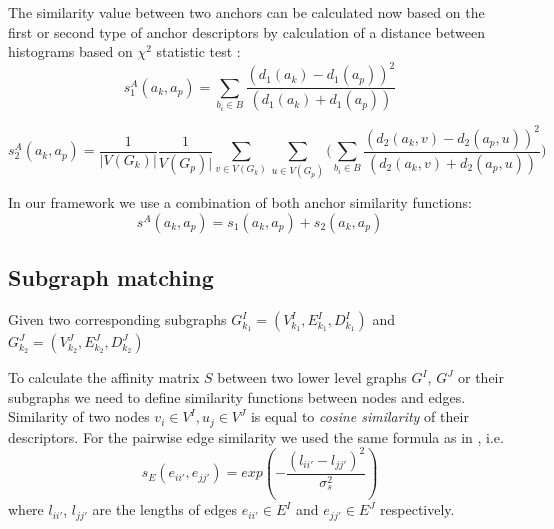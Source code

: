 The similarity value between two anchors can be calculated now based on the first or second type of anchor descriptors by calculation of a distance between histograms based on $\chi^2$ statistic test \cite{Weken2004_ChiSqTest}:
\begin{equation}
s^A_1(a_k, a_p) = \sum_{b_i\in B}\frac{(d_1(a_k)-d_1(a_p))^2}{(d_1(a_k)+d_1(a_p))}
\end{equation}

\begin{equation}
s^A_2(a_k, a_p) = \frac{1}{|V(G_k)|}\frac{1}{V(G_p)|}\sum_{v\in V(G_k)}\sum_{u\in V(G_p)} \big(\sum_{b_i\in B}\frac{(d_2(a_k,v)-d_2(a_p,u))^2}{(d_2(a_k,v)+d_2(a_p,u))}\big)
\end{equation}

In our framework we use a combination of both anchor similarity functions:
\begin{equation}
s^A(a_k, a_p) = s_1(a_k, a_p)+s_2(a_k, a_p) 
\end{equation}

\subsection{Subgraph matching}
Given two corresponding subgraphs $G^I_{k_1}=(V^I_{k_1},E^I_{k_1},D^I_{k_1})$ and $G^J_{k_2}=(V^J_{k_2},E^J_{k_2},D^J_{k_2})$

To calculate the affinity matrix $S$ between two lower level graphs  $G^I$, $G^J$ or their subgraphs we need to define similarity functions between nodes and edges. Similarity of two nodes $v_i\in V^I, u_j\in V^J$ is equal to \emph{cosine similarity} of their descriptors.
For the pairwise edge similarity we used the same formula as in \cite{Cho2014_Haystack, Suh_CVPR2015}, i.e.\ 
\begin{equation}
s_E(e_{ii\prime}, e_{jj\prime}) = exp(-\frac{(l_{ii\prime} - l_{jj\prime})^2}{\sigma^2_{s}})
\label{eq:s_e}
\end{equation}
where $l_{ii\prime}$, $l_{jj\prime} $ are the lengths of edges $e_{ii\prime}\in E^I$ and $e_{jj\prime}\in E^J$ respectively.

